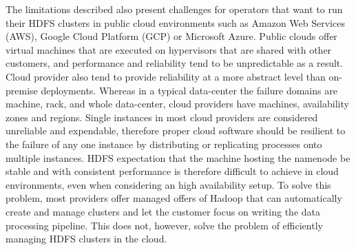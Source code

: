 The limitations described also present challenges for operators that want to run their HDFS clusters in public cloud environments such as Amazon Web Services (AWS), Google Cloud Platform (GCP) or Microsoft Azure.
Public clouds offer virtual machines that are executed on hypervisors that are shared with other customers, and performance and reliability tend to be unpredictable as a result.
Cloud provider also tend to provide reliability at a more abstract level than on-premise deployments.
Whereas in a typical data-center the failure domains are machine, rack, and whole data-center, cloud providers have machines, availability zones and regions.
Single instances in most cloud providers are considered unreliable and expendable, therefore proper cloud software should be resilient to the failure of any one instance by distributing or replicating processes onto multiple instances.
HDFS expectation that the machine hosting the namenode be stable and with consistent performance is therefore difficult to achieve in cloud environments, even when considering an high availability setup.
To solve this problem, most providers offer managed offers of Hadoop that can automatically create and manage clusters and let the customer focus on writing the data processing pipeline.
This does not, however, solve the problem of efficiently managing HDFS clusters in the cloud.

